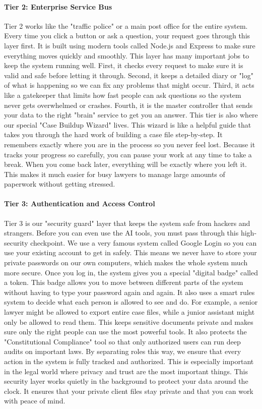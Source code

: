 \documentclass[a4paper,fleqn]{cas-dc}
\begin{document}
\paragraph{\textbf{Tier 2: Enterprise Service Bus}}
Tier 2 works like the "traffic police" or a main post office for the entire system. Every time you click a button or ask a question, your request goes through this layer first. It is built using modern tools called Node.js and Express to make sure everything moves quickly and smoothly. This layer has many important jobs to keep the system running well. First, it checks every request to make sure it is valid and safe before letting it through. Second, it keeps a detailed diary or "log" of what is happening so we can fix any problems that might occur. Third, it acts like a gatekeeper that limits how fast people can ask questions so the system never gets overwhelmed or crashes. Fourth, it is the master controller that sends your data to the right "brain" service to get you an answer. This tier is also where our special "Case Buildup Wizard" lives. This wizard is like a helpful guide that takes you through the hard work of building a case file step-by-step. It remembers exactly where you are in the process so you never feel lost. Because it tracks your progress so carefully, you can pause your work at any time to take a break. When you come back later, everything will be exactly where you left it. This makes it much easier for busy lawyers to manage large amounts of paperwork without getting stressed.

\paragraph{\textbf{Tier 3: Authentication and Access Control}}
Tier 3 is our "security guard" layer that keeps the system safe from hackers and strangers. Before you can even use the AI tools, you must pass through this high-security checkpoint. We use a very famous system called Google Login so you can use your existing account to get in safely. This means we never have to store your private passwords on our own computers, which makes the whole system much more secure. Once you log in, the system gives you a special "digital badge" called a token. This badge allows you to move between different parts of the system without having to type your password again and again. It also uses a smart rules system to decide what each person is allowed to see and do. For example, a senior lawyer might be allowed to export entire case files, while a junior assistant might only be allowed to read them. This keeps sensitive documents private and makes sure only the right people can use the most powerful tools. It also protects the "Constitutional Compliance" tool so that only authorized users can run deep audits on important laws. By separating roles this way, we ensure that every action in the system is fully tracked and authorized. This is especially important in the legal world where privacy and trust are the most important things. This security layer works quietly in the background to protect your data around the clock. It ensures that your private client files stay private and that you can work with peace of mind.
\end{document}

